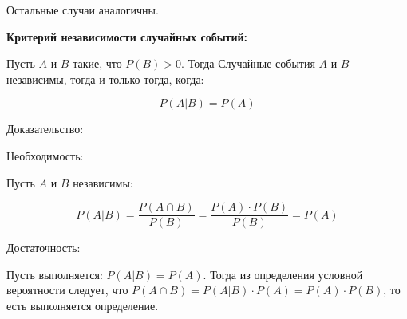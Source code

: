     Остальные случаи аналогичны.
    \bigskip

\textbf{Критерий независимости случайных событий:}
    \smallskip

    Пусть $A$ и $B$ такие, что $P(B) > 0$. Тогда Случайные
    события $A$ и $B$ независимы, тогда и только тогда, когда:

    \[
        P(A|B) = P(A)  
    \]
    \bigskip

    Доказательство:
    \bigskip

    Необходимость:
    \smallskip

    Пусть $A$ и $B$ независимы:

    \[
        P(A|B) = \frac{P(A \cap B)}{P(B)} = \frac{P(A) \cdot P(B)}{P(B)} = P(A)  
    \]
    \bigskip

    Достаточность:
    \smallskip

    Пусть выполняется: $P(A|B) = P(A)$. Тогда из определения условной вероятности
    следует, что $P(A \cap B) = P(A|B) \cdot P(A) = P(A) \cdot P(B)$,
    то есть выполняется определение.


